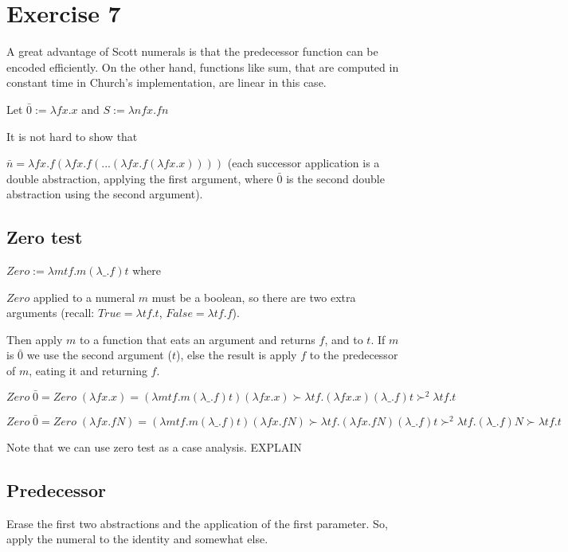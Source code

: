 
\section*{Exercise 7}

A great advantage of Scott numerals is that the predecessor function can be
encoded efficiently. On the other hand, functions like sum, that are computed
in constant time in Church's implementation, are linear in this case.

Let $ \bar{0} := \lambda f x . x $ and $ S := \lambda n f x . f n $

It is not hard to show that

$ \bar{n}
= \lambda f x . f (\lambda f x . f ( ...(\lambda f x . f (\lambda f x. x))))$
(each successor application is a double abstraction, applying the first
argument, where $\bar{0}$ is the second double abstraction using the second
argument).

\subsection*{Zero test}

$Zero := \lambda m t f . m (\lambda \_ . f) t$ where


$Zero$ applied to a numeral $m$ must be a boolean, so there are two extra
arguments (recall: $True = \lambda t f.t$, $False = \lambda t f . f$).

Then apply $m$ to a function that eats an argument and returns $f$, and to
$t$. If $m$ is $\bar{0}$ we use the second argument ($t$), else the result is
apply $f$ to the predecessor of $m$, eating it and returning $f$.

$$
Zero \; \bar{0} = Zero \; (\lambda f x . x) =
(\lambda m t f . m (\lambda \_ . f) t) (\lambda f x . x) \succ
\lambda t f . (\lambda f x . x) (\lambda \_ . f) t  \succ^{2} \lambda t f .t
$$

$$
Zero \; \bar{0} = Zero \; (\lambda f x . f N) =
(\lambda m t f . m (\lambda \_ . f) t) (\lambda f x . f N) \succ
\lambda t f . (\lambda f x . f N) (\lambda \_ . f) t
\succ^{2} \lambda t f . (\lambda \_ . f) N \succ \lambda t f . t
$$

Note that we can use zero test as a case analysis. EXPLAIN


\subsection*{Predecessor}

Erase the first two abstractions and the application of the first
parameter. So, apply the numeral to the identity and somewhat else.


